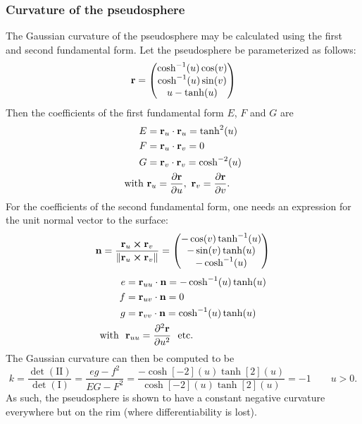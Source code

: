 \subsubsection{Curvature of the pseudosphere}
The Gaussian curvature of the pseudosphere may be calculated using the first and second fundamental form. Let the pseudosphere be parameterized as follows: 
    \[ 
        \vb{r} = \mqty(\cosh[-1](u)\cos(v)\\
                      \cosh[-1](u)\sin(v)\\
                  u - \tanh(u))
    \]
Then the coefficients of the first fundamental form \(E\), \(F\) and \(G\) are
    \begin{equation*}
        \begin{split}
            E &= \vb{r}_u \cdot \vb{r}_u = \tanh[2](u) \\
            F &= \vb{r}_u \cdot \vb{r}_v = 0 \\
            G &= \vb{r}_v \cdot \vb{r}_v = \cosh[-2](u) \\
            \text{with } & \vb{r}_u = \pdv{\vb{r}}{u},\ \vb{r}_v = \pdv{\vb{r}}{v}.
        \end{split}
    \end{equation*}
For the coefficients of the second fundamental form, one needs an expression for the unit normal vector to the surface:
    \[
        \vb{n} =  \frac{\vb{r}_u \cross \vb{r}_v}{\norm{\vb{r}_u \cross \vb{r}_v}} 
        = \mqty(-\cos(v)\tanh[-1](u) \\
                -\sin(v)\tanh(u)\\
                -\cosh[-1](u)\\
                )
    \]
\begin{equation*}
    \begin{split}
        e &= \vb{r}_{uu} \cdot \vb{n} = -\cosh[-1](u)\tanh(u)\\
        f &= \vb{r}_{uv} \cdot \vb{n} = 0\\
        g &= \vb{r}_{vv} \cdot \vb{n} = \cosh[-1](u)\tanh(u)\\
        \text{with }\ & \vb{r}_{uu} = \pdv[2]{\vb{r}}{u}\ \text{ etc.}
    \end{split}
\end{equation*}
The Gaussian curvature can then be computed to be \cite{ONeill2006}
\begin{equation}
    k = \frac{\det(\mathrm{II})}{\det(\mathrm{I})} = \frac{eg - f^2}{EG - F^2} = \frac{-\cosh[-2](u)\tanh[2](u)}{\cosh[-2](u)\tanh[2](u)} = -1 \qquad u > 0.
\end{equation}
As such, the pseudosphere is shown to have a constant negative curvature everywhere but on the rim (where differentiability is lost).

